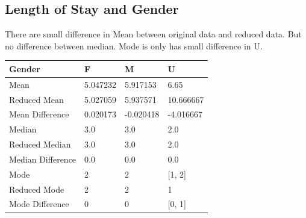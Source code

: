 \documentclass[
	letterpaper, %
]{jdf}
\begin{document}
\subsection{Length of Stay and Gender}
There are small difference in Mean between original data and reduced data. But no difference between median. Mode is only has small difference in U.  
\begin{jdftable}
\label{table:Example}
\small %
\begin{tabular}{@{} llll}
\textbf{Gender} & \textbf{F} &\textbf{M} & \textbf{U}\\
	\toprule[0.5pt]

Mean           &  5.047232 &  5.917153 &       6.65 \\
\midrule
Reduced Mean   &  5.027059 &  5.937571 &  10.666667 \\
\midrule
Mean Difference                   &  0.020173 & -0.020418 &  -4.016667 \\
\midrule
Median         &       3.0 &       3.0 &        2.0 \\
\midrule
Reduced Median &       3.0 &       3.0 &        2.0 \\
\midrule
Median Difference                 &       0.0 &       0.0 &        0.0 \\
\midrule
Mode           &         2 &         2 &     [1, 2] \\
\midrule
Reduced Mode   &         2 &         2 &          1 \\
\midrule
Mode Difference                   &         0 &         0 &     [0, 1] \\
\end{tabular}
\end{jdftable}
\end{document}
